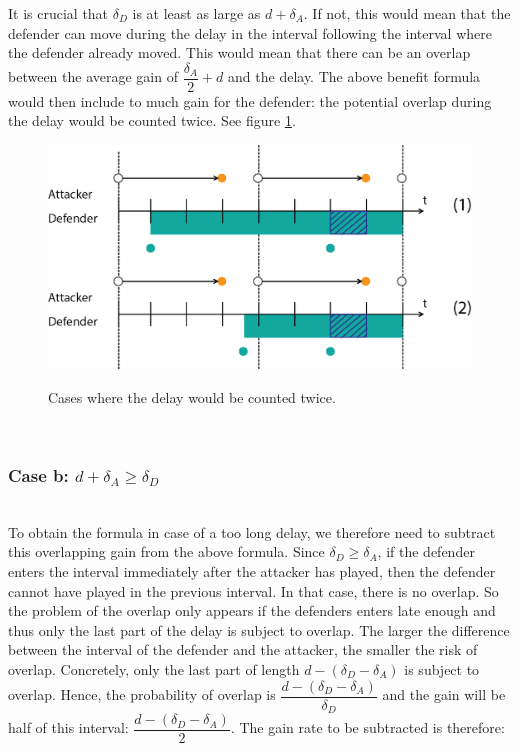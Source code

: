 It is crucial that $ \delta_{D}$ is at least as large as $d + \delta_{A}$. If not, this would mean that the defender can move during the delay in the interval following the interval where the defender already moved. This would mean that there can be an overlap between the average gain of $\dfrac{\delta_{A}}{2}+d$ and the delay. The above benefit formula would then include to much gain for the defender: the potential overlap during the delay would be counted twice. See figure \ref{overlap}.\\
\begin{figure}[hbtp]
\caption{Cases where the delay would be counted twice.}
\centering
\includegraphics[scale=0.7]{Images/FlipItcase2b.png}
\label{overlap}
\end{figure}


~~ \\
\subsubsection*{\textbf{Case b:} $d + \delta_{A} \geq \delta_{D}$}
~~~\\

To obtain the formula in case of a too long delay, we therefore need to subtract this overlapping gain from the above formula. 
Since $\delta_{D} \geq \delta_{A}$, if the defender enters the interval immediately after the attacker has played, then the defender cannot have played in the previous interval. In that case, there is no overlap. So the problem of the overlap only appears if the defenders enters late enough and thus only the last part of the delay is subject to overlap. The larger the difference between the interval of the defender and the attacker, the smaller the risk of overlap. Concretely, only the last part of length $d - (\delta_{D} - \delta_{A})$ is subject to overlap. Hence, the probability of overlap is $\dfrac{ d - (\delta_{D} - \delta_{A})}{\delta_{D}}$ and the gain will be half of this interval:  $\dfrac{ d - (\delta_{D} - \delta_{A})}{2}$.  The gain rate to be subtracted is therefore:\\

